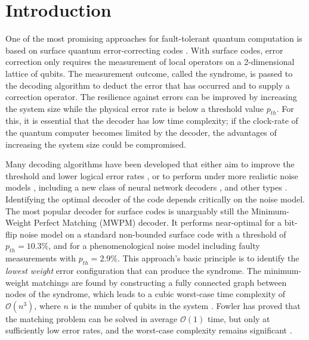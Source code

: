 \section{Introduction}\label{sec:introduction}
One of the most promising approaches for fault-tolerant quantum computation is based on surface quantum error-correcting codes \cite{dennis2002topological, kitaev2003fault}. With surface codes, error correction only requires the measurement of local operators on a 2-dimensional lattice of qubits. The measurement outcome, called the syndrome, is passed to the decoding algorithm to deduct the error that has occurred and to supply a correction operator. The resilience against errors can be improved by increasing the system size while the physical error rate is below a threshold value $p_{th}$. For this, it is essential that the decoder has low time complexity; if the clock-rate of the quantum computer becomes limited by the decoder, the advantages of increasing the system size could be compromised.

Many decoding algorithms have been developed that either aim to improve the threshold and lower logical error rates \cites{wang2003confinement, raussendorf2007faulttolerant, fowler2012towards, fowler2013minimum, heim2016optimal, duclos2010fast, duclos2013fault, bravyi2014efficient, darmawan2018linear}, or to perform under more realistic noise models \cites{tuckett2020fault, hutter2015improved, bravyi2013quantum,  nickerson2019analysing, wootton2012high, huang2020fault}, including a new class of neural network decoders \cites{baireuther2019neural, chamberland2018deep, liu2019neural, nautrup2019optimizing, torlai2017neural, varsamopoulos2017decoding, varsamopoulos2020decoding}, and other types \cites{bombin2012universal, herold2015cellular, horsman2012surface, kubica2019cellular, watson2015fast}. Identifying the optimal decoder of the code depends critically on the noise model. The most popular decoder for surface codes is unarguably still the Minimum-Weight Perfect Matching (MWPM) decoder. It performs near-optimal for a bit-flip noise model \cite{dennis2002topological} on a standard non-bounded surface code with a threshold of $p_{th} = 10.3\%$, and for a phenomenological noise model including faulty measurements \cite{wang2003confinement} with $p_{th} = 2.9\%$. This approach's basic principle is to identify the \emph{lowest weight} error configuration that can produce the syndrome. The minimum-weight matchings are found by constructing a fully connected graph between nodes of the syndrome, which leads to a cubic worst-case time complexity of $\mathcal{O}(n^3)$, where $n$ is the number of qubits in the system \cite{kolmogorov2009blossom}. Fowler has proved that the matching problem can be solved in average $\mathcal{O}(1)$ time, but only at sufficiently low error rates, and the worst-case complexity remains significant \cite{fowler2013minimum}. 

